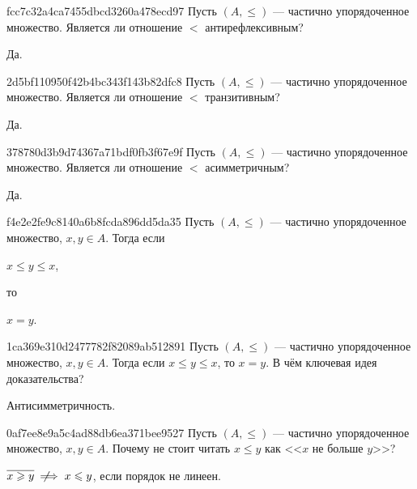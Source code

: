 \begin{note}{fcc7c32a4ca7455dbcd3260a478ecd97}
    Пусть \({ (A, \leqslant) }\) --- частично упорядоченное множество.
    Является ли отношение \({ < }\) антирефлексивным?

   \begin{cloze}{1}
       Да.
   \end{cloze}
\end{note}

\begin{note}{2d5bf110950f42b4bc343f143b82dfc8}
    Пусть \({ (A, \leqslant) }\) --- частично упорядоченное множество.
    Является ли отношение \({ < }\) транзитивным?

    \begin{cloze}{1}
        Да.
    \end{cloze}
\end{note}

\begin{note}{378780d3b9d74367a71bdf0fb3f67e9f}
    Пусть \({ (A, \leqslant) }\) --- частично упорядоченное множество.
    Является ли отношение \({ < }\) асимметричным?

    \begin{cloze}{1}
        Да.
    \end{cloze}
\end{note}

\begin{note}{f4e2e2fe9c8140a6b8fcda896dd5da35}
    Пусть \({ (A, \leqslant) }\) --- частично упорядоченное множество, \({ x, y \in A }\).
    Тогда если \begin{icloze}{2}\({ x \leqslant y \leqslant x }\),\end{icloze} то \begin{icloze}{1}\({ x = y }\).\end{icloze}
\end{note}

\begin{note}{1ca369e310d2477782f82089ab512891}
    Пусть \({ (A, \leqslant) }\) --- частично упорядоченное множество, \({ x, y \in A }\).
    Тогда если \({ x \leqslant y \leqslant x }\), то \({ x = y }\).
    В чём ключевая идея доказательства?

    \begin{cloze}{1}
        Антисимметричность.
    \end{cloze}
\end{note}

\begin{note}{0af7ee8e9a5c4ad88db6ea371bee9527}
    Пусть \({ (A, \leqslant) }\) --- частично упорядоченное множество, \({ x, y \in A }\).
    Почему не стоит читать \({ x \leqslant y }\) как <<\({ x }\) не больше \({ y }\)>>?

    \begin{cloze}{1}
        \({ \overline{x \geqslant y} \:\:\not\!\!\!\implies x \leqslant y }\), если порядок не линеен.
    \end{cloze}
\end{note}


